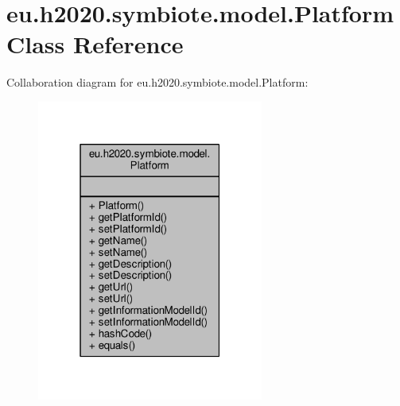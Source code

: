 \hypertarget{classeu_1_1h2020_1_1symbiote_1_1model_1_1Platform}{}\section{eu.\+h2020.\+symbiote.\+model.\+Platform Class Reference}
\label{classeu_1_1h2020_1_1symbiote_1_1model_1_1Platform}


Collaboration diagram for eu.\+h2020.\+symbiote.\+model.\+Platform\+:
\nopagebreak
\begin{figure}[H]
\begin{center}
\leavevmode
\includegraphics[width=211pt]{classeu_1_1h2020_1_1symbiote_1_1model_1_1Platform__coll__graph}
\end{center}
\end{figure}
